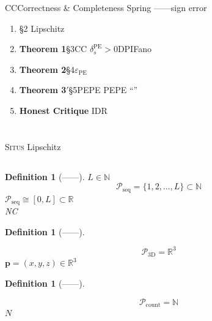 \documentclass[11pt,a4paper]{article}
\newtheorem{definition}[theorem]{Definition}
\theoremstyle{remark}
\DeclareMathOperator{\PE}{PE}
\newcommand{\R}{\mathbb{R}}
\newcommand{\N}{\mathbb{N}}
\newcommand{\Ppos}{\mathcal{P}}
\newcommand{\Situs}{\textsc{Situs}}
\begin{document}
CCCorrectness \& Completeness\cite{scx2026cc_audit}
Spring
——sign error

\textbf{}
\begin{enumerate}[label=(\arabic*)]
    \item \textbf{}\S2
          Lipschitz
    \item \textbf{Theorem 1}\S3CC
          $\delta_s^{\PE} > 0$DPIFano
    \item \textbf{Theorem 2}\S4$\varepsilon_{\PE}$
          
    \item \textbf{Theorem 3$'$}\S5PEPE
          PEPE
          ``''
    \item \textbf{Honest Critique}
          IDR
\end{enumerate}

\section{}

\Situs{}
\textbf{}
Lipschitz

\subsection{}

\begin{definition}[——]
\label{def:1.1.1}
$L \in \N$
\begin{equation}
    \Ppos_{\text{seq}} = \{1, 2, \ldots, L\} \subset \N
\end{equation}
$\Ppos_{\text{seq}} \cong [0, L] \subset \R$\\
\textbf{}NC
\end{definition}

\begin{definition}[——]
\label{def:1.1.2}

\begin{equation}
    \Ppos_{\text{3D}} = \R^3
\end{equation}
$\mathbf{p} = (x, y, z) \in \R^3$\\
\textbf{}
\textbf{}
\end{definition}

\begin{definition}[——]
\label{def:1.1.3}

\begin{equation}
    \Ppos_{\text{count}} = \N
\end{equation}
$N$\\
\textbf{}
\end{definition}
\end{document}
